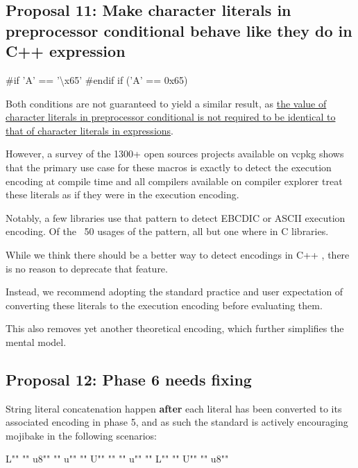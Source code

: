 \documentclass{wg21}
\begin{document}
\subsection{Proposal 11: Make character literals in preprocessor conditional behave like they do in C++ expression}

\begin{colorblock}
#if 'A' == '\textbackslash x65'
#endif
if ('A' == 0x65){}
\end{colorblock}

Both conditions are not guaranteed to yield a similar result, as \href{http://eel.is/c++draft/cpp#cond-12}{the value of character literals in preprocessor conditional is not required to be identical to that of character literals in expressions}.

However, a survey of the 1300+ open sources projects available on vcpkg shows that the primary use case for these macros is exactly to detect the
execution encoding at compile time and all compilers available on compiler explorer treat these literals as if they were in the execution encoding.

Notably, a few libraries use that pattern to detect EBCDIC or ASCII execution encoding.
Of the ~50 usages of the pattern, all but one where in C libraries.

While we think there should be a better way to detect encodings in C++ \cite{P1885R2}, there is no reason to deprecate that feature.

Instead, we recommend adopting the standard practice and user expectation of converting these literals to the execution encoding before evaluating them.

This also removes yet another theoretical encoding, which further simplifies the mental model. 

\pagebreak

\subsection{Proposal 12: Phase 6 needs fixing}

String literal concatenation happen \textbf{after} each literal has been converted to its associated encoding in phase 5, and as such the standard is actively encouraging mojibake in the following scenarios:

\begin{colorblock}
    L"" ""
    u8"" ""
    u"" ""
    U"" ""
    "" u""
    "" L""
    "" U""
    "" u8""
\end{colorblock}
\end{document}
